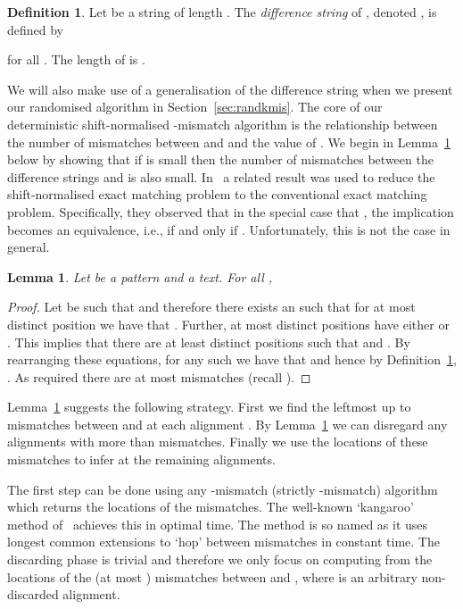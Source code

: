 \documentclass[11pt]{article}
\theoremstyle{plain}
\newtheorem{lemma}[theorem]{Lemma}
\theoremstyle{definition}
\newtheorem{definition}[theorem]{Definition}
\begin{document}
\begin{definition}
    \label{dfn:diffstr}
    Let  be a string of length . The \emph{difference string} of , denoted , is defined by

for all . The length of  is .
\end{definition}

We will also make use of a generalisation of the difference string when we present our randomised algorithm in Section~\ref{sec:randkmis}. The core of our deterministic shift-normalised -mismatch algorithm is the relationship between the number of mismatches between  and  and the value of . We begin in Lemma~\ref{lem:TI-up} below by showing that if  is small then the number of mismatches between the difference strings  and  is also small. In~\cite{MNU:2005} a related result was used to reduce the shift-normalised exact matching problem to the conventional exact matching problem. Specifically, they observed that in the special case that , the implication becomes an equivalence, i.e.,  if and only if . Unfortunately, this is not the case in general.

\begin{lemma}
    \label{lem:TI-up}
    Let  be a pattern and  a text. For all ,

\end{lemma}
\begin{proof}
    Let  be such that  and therefore there exists an  such that for at most  distinct position  we have that . Further, at most  distinct positions  have either  or . This implies that there are at least  distinct positions  such that  and . By rearranging these equations, for any such  we have that  and hence by Definition~\ref{dfn:diffstr}, . As required there are at most  mismatches (recall ).
\end{proof}

Lemma~\ref{lem:TI-up} suggests the following strategy. First we find the leftmost up to  mismatches between  and  at each alignment . By Lemma~\ref{lem:TI-up} we can disregard any alignments with more than  mismatches. Finally we use the locations of these mismatches to infer  at the remaining alignments.

The first step can be done using any -mismatch (strictly -mismatch) algorithm which returns the locations of the mismatches. The well-known `kangaroo' method of~\cite{LV:1986a} achieves this in optimal  time. The method is so named as it uses longest common extensions to `hop' between mismatches in constant time. The discarding phase is trivial and therefore we only focus on computing  from the locations of the (at most ) mismatches between  and , where  is an arbitrary non-discarded alignment.
\end{document}
